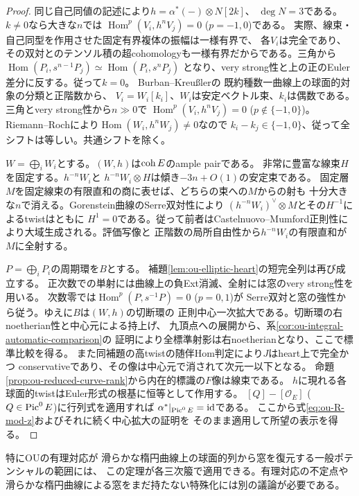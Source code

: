 \begin{proof}
同じ自己同値の記述により$h=\alpha^*(-)\otimes N[2k]$、
$\deg N=3$である。$k\ne0$なら大きな$n$では
$\operatorname{Hom}^p(V_i,h^nV_j)=0$ ($p=-1,0$)である。
実際、線束・自己同型を作用させた固定有界複体の振幅は一様有界で、
各$V_i$は完全であり、その双対とのテンソル積の超cohomologyも一様有界だからである。三角から
$\operatorname{Hom}(P_i,s^{n-1}P_j)\simeq\operatorname{Hom}(P_i,s^nP_j)$
となり、very strong性と上の正のEuler差分に反する。従って$k=0$。
Burban--Kreu{\ss}ler\cite[Proposition~4.13]{BurbanKreu2006}の
既約種数一曲線上の球面的対象の分類と正階数から、
$V_i=W_i[k_i]$、$W_i$は安定ベクトル束、$k_i$は偶数である。
三角とvery strong性から$n\gg0$で
$\operatorname{Hom}^p(V_i,h^n V_j)=0$ ($p\notin\{-1,0\}$)。
Riemann--Rochにより$\operatorname{Hom}(W_i,h^nW_j)\ne0$なので
$k_i-k_j\in\{-1,0\}$、従って全シフトは等しい。共通シフトを除く。

$W=\bigoplus_i W_i$とする。$(W,h)$は$\operatorname{coh} E$のample pairである。
非常に豊富な線束$H$を固定する。$h^{-n}W_i$と
$h^{-n}W_i\otimes H$は傾き$-3n+O(1)$の安定束である。
固定層$M$を固定線束の有限直和の商に表せば、どちらの束への$M$からの射も
十分大きな$n$で消える。Gorenstein曲線のSerre双対性により
$(h^{-n}W_i)^\vee\otimes M$とその$H^{-1}$によるtwistはともに
$H^1=0$である。従って前者はCastelnuovo--Mumford正則性により大域生成される。評価写像と
正階数の局所自由性から$h^{-n}W_i$の有限直和が$M$に全射する。

$P=\bigoplus_i P_i$の周期環を$B$とする。
補題\ref{lem:ou-elliptic-heart}の短完全列は再び成立する。
正次数での単射には曲線上の負Ext消滅、全射には窓のvery strong性を用いる。
次数零では$\operatorname{Hom}^p(P,s^{-1}P)=0$ ($p=0,1$)が
Serre双対と窓の強性から従う。ゆえに$B$は$(W,h)$の切断環の
正則中心一次拡大である。切断環の右noetherian性と中心元による持上げ、
九頂点への展開から、系\ref{cor:ou-integral-automatic-comparison}の
証明により全標準射影は右noetherianとなり、ここで標準比較を得る。
また同補題の高twistの随伴Hom判定により$J$はheart上で完全かつ
conservativeであり、その像は中心元で消されて次元一以下となる。
命題\ref{prop:ou-reduced-curve-rank}から内在的標識の$F$像は線束である。
$h$に現れる各球面的twistはEuler形式の根基に恒等として作用する。
$[Q]-[\mathcal O_E]$ ($Q\in\operatorname{Pic}^0 E$)に行列式を適用すれば
$\alpha^*|_{\operatorname{Pic}^0 E}=\mathrm{id}$である。
ここから式\eqref{eq:ou-R-mod-z}およびそれに続く中心拡大の証明を
そのまま適用して所望の表示を得る。
\end{proof}

特にOU\cite[Definition~6.3, Theorem~6.4]{OU}の有理対応が
滑らかな楕円曲線上の球面的列から窓を復元する一般ポテンシャルの範囲には、
この定理が各三次箙で適用できる。有理対応の不定点や
滑らかな楕円曲線による窓をまだ持たない特殊化には別の議論が必要である。
